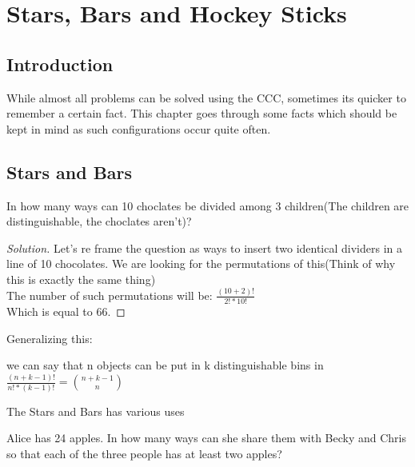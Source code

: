 \chapter{Stars, Bars and Hockey Sticks}
\section{Introduction}
While almost all problems can be solved using the CCC, sometimes its quicker to remember a certain fact. This chapter goes through some facts which should be kept in mind as such configurations occur quite often.
\section{Stars and Bars}
\begin{example}
     In how many ways can 10 choclates be divided among 3 children(The children are distinguishable, the choclates aren't)?
\end{example}
\begin{proof}
    [Solution]
    Let's re frame the question as ways to insert two identical dividers in a line of 10 chocolates. We are looking for the permutations of this(Think of why this is exactly the same thing)\\
    The number of such permutations will be: $\frac{(10+2)!}{2!*10!}$\\
    Which is equal to 66.
\end{proof}
Generalizing this: 
\begin{theorem}
    we can say that n objects can be put in k distinguishable bins in   $\frac{(n+k-1)!}{n!*(k-1)!}=\binom{n+k-1}{n}$
\end{theorem}
The Stars and Bars has various uses
\begin{example}
    Alice has 24 apples. In how many ways can she share them with Becky and Chris so that each of the three people has at least two apples?
\end{example}
